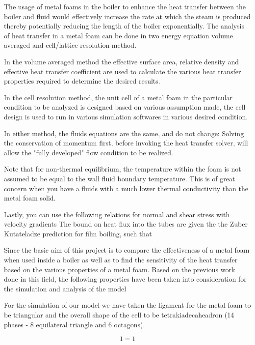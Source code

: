 \documentclass[compileTAMUreport.tex]{subfiles}
\begin{document}
The usage of metal foams in the boiler to enhance the heat transfer between the boiler and fluid  would effectively increase the rate at which the steam is produced thereby potentially reducing the length of the boiler exponentially. %
The analysis of heat transfer in a metal foam can be done in two energy equation volume averaged and cell/lattice resolution method.

In the volume averaged method the effective surface area, relative density and effective heat transfer coefficient  are used to calculate the various heat transfer properties required to determine the desired results. 

In the cell resolution method, the unit cell of a metal foam in the particular condition to be analyzed is designed based on various assumption made, the cell design is used to run in various simulation softwares in various desired condition.

In either method, the fluids equations are the same, and do not change:
Solving the conservation of momentum first, before invoking the heat transfer solver, will allow the "fully developed" flow condition to be realized.


Note that for non-thermal equilibrium, the temperature within the foam is not assumed to be equal to the wall fluid boundary temperature. This is of great concern when you have a fluids with a much lower thermal conductivity than the metal foam solid. 

Lastly, you can use the following relations for normal and shear stress with velocity gradients
The bound on heat flux into the tubes are given the the Zuber Kutateladze prediction for film boiling, such that 


Since the basic aim of this project is to compare the effectiveness of a metal foam when used inside a boiler as well as to find the sensitivity of the heat transfer based on the various properties of a metal foam. Based on the previous work done in this field, the following properties have been taken into consideration for the simulation and analysis of the model

For the simulation of our model we have taken the ligament for the metal foam to be triangular and the overall shape of the cell to be tetrakiadecaheadron (14 phases - 8 equilateral triangle and 6 octagons).

\begin{equation}
1=1
\end{equation}
\end{document}
